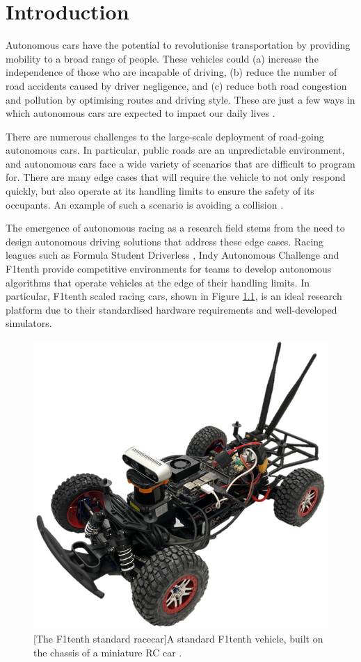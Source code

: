 \chapter{Introduction}
\label{chp:introduction}

Autonomous cars have the potential to revolutionise transportation by providing mobility to a broad range of people. 
These vehicles could (a) increase the independence of those who are incapable of driving, (b) reduce the number of road accidents caused by driver negligence, and (c) reduce both road congestion and pollution by optimising routes and driving style. 
These are just a few ways in which autonomous cars are expected to impact our daily lives \cite{klaver}. 

There are numerous challenges to the large-scale deployment of road-going autonomous cars. 
In particular, public roads are an unpredictable environment, and autonomous cars face a wide variety of scenarios that are difficult to program for.
There are many edge cases that will require the vehicle to not only respond quickly, but also operate at its handling limits to ensure the safety of its occupants.
An example of such a scenario is avoiding a collision \cite{Barab_s_2017}. 

The emergence of autonomous racing as a research field stems from the need to design autonomous driving solutions that address these edge cases.
Racing leagues such as Formula Student Driverless \cite{Hanqing2018}, Indy Autonomous Challenge \cite{Wischnewski2022} and F1tenth \cite{Babu2020} provide competitive environments for teams to develop autonomous algorithms that operate vehicles at the edge of their handling limits.
In particular, F1tenth scaled racing cars, shown in Figure \ref{fig:f1tenth_car}, is an ideal research platform due to their standardised hardware requirements and well-developed simulators.

\begin{figure}[htb]
\centering
  \includegraphics[width=.4\textwidth]{contents/chapt1/figs/f1tenth_car.png}
  [The F1tenth standard racecar]{A standard F1tenth vehicle, built on the chassis of a miniature RC car \cite{f1tenth}.}
  \label{fig:f1tenth_car}
\end{figure}


